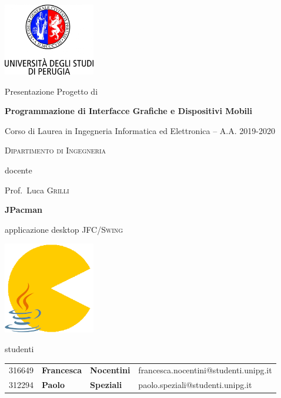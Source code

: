 \documentclass[12pt,a4paper]{report}
\begin{document}
\begin{titlepage}
	\centering
	\includegraphics[width=0.30\textwidth]{logo-unipg}\par\vspace{1cm}
	\large{Presentazione Progetto di}\par
	\large{\textbf{Programmazione di Interfacce Grafiche e Dispositivi Mobili}}\par
	\small{Corso di Laurea in Ingegneria Informatica ed Elettronica -- A.A. 2019-2020}\par
	\textsc{\small{Dipartimento di Ingegneria}}\par

	\vspace{0.5cm}
	docente\par
	Prof.~Luca \textsc{Grilli}

	\vspace{1cm}
	\vspace{1cm}
	\textbf{\huge{JPacman}}\par
	\vspace{0.2cm}
	applicazione desktop \textsc{JFC/Swing}\par
	\vspace{0.5cm}
	\includegraphics[width=0.30\textwidth]{jpacman-icon}\par\vspace{1cm}
	\vspace{1cm}

	\large{studenti}\par
	\vspace{0.2cm}
	\begin{tabular}{ l l l l }
	\large{316649} & \large{\textbf{Francesca}} & \large{\textbf{Nocentini}} & \large{francesca.nocentini@studenti.unipg.it}\\
	\large{312294} & \large{\textbf{Paolo}} & \large{\textbf{Speziali}} & \large{paolo.speziali@studenti.unipg.it}\\
	\end{tabular}


\end{titlepage}
\end{document}
